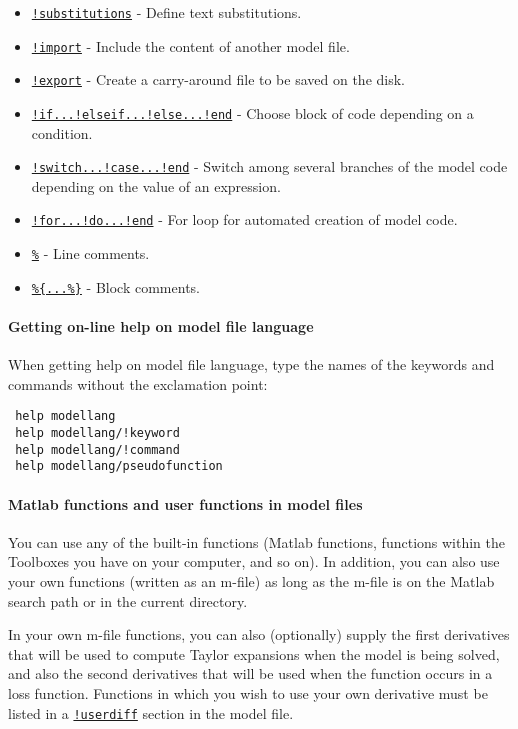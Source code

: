  \begin{itemize}
 \item
   \href{modellang/substitutions}{\texttt{!substitutions}} - Define text
   substitutions.
 \item
   \href{modellang/import}{\texttt{!import}} - Include the content of
   another model file.
 \item
   \href{modellang/export}{\texttt{!export}} - Create a carry-around file
   to be saved on the disk.
 \item
   \href{modellang/if}{\texttt{!if...!elseif...!else...!end}} - Choose
   block of code depending on a condition.
 \item
   \href{modellang/switch}{\texttt{!switch...!case...!end}} - Switch
   among several branches of the model code depending on the value of an
   expression.
 \item
   \href{modellang/for}{\texttt{!for...!do...!end}} - For loop for
   automated creation of model code.
 \item
   \href{modellang/linecomments}{\texttt{\%}} - Line comments.
 \item
   \href{modellang/blockcomments}{\texttt{\%\{...\%\}}} - Block comments.
 \end{itemize}
 
 \paragraph{Getting on-line help on model file language}
 
 When getting help on model file language, type the names of the keywords
 and commands without the exclamation point:
 
 \begin{verbatim}
 help modellang
 help modellang/!keyword
 help modellang/!command 
 help modellang/pseudofunction
 \end{verbatim}
 
 \paragraph{Matlab functions and user functions in model files}
 
 You can use any of the built-in functions (Matlab functions, functions
 within the Toolboxes you have on your computer, and so on). In addition,
 you can also use your own functions (written as an m-file) as long as
 the m-file is on the Matlab search path or in the current directory.
 
 In your own m-file functions, you can also (optionally) supply the first
 derivatives that will be used to compute Taylor expansions when the
 model is being solved, and also the second derivatives that will be used
 when the function occurs in a loss function. Functions in which you wish
 to use your own derivative must be listed in a
 \href{modellang/userdiff}{\texttt{!userdiff}} section in the model file.
 
